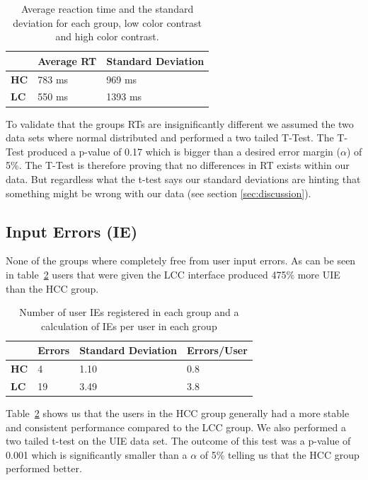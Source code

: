 \documentclass[runningheads,a4paper]{llncs}
\begin{document}
\begin{table}[]
	\centering
	\setlength{\tabcolsep}{1em}
	\setlength\extrarowheight{1em}
	\begin{tabular}{l|l|l}
		\textbf{} & \textbf{Average RT} & \textbf{Standard Deviation} \\ \hline
		\textbf{HC} & 783 ms & 969 ms \\ \hline
		\textbf{LC} & 550 ms & 1393 ms
	\end{tabular}
	\caption{Average reaction time and the standard deviation for each group, low color contrast and high color contrast.}
	\label{tab:groupRT}
\end{table}

To validate that the groups RTs are insignificantly different we assumed the two data sets where normal distributed and performed a two tailed T-Test. The T-Test produced a p-value of 0.17 which is bigger than a desired error margin ($\alpha$) of 5\%. The T-Test is therefore proving that no differences in RT exists within our data. But regardless what the t-test says our standard deviations are hinting that something might be wrong with our data (see section \ref{sec:discussion}).

\subsection{Input Errors (IE)}
None of the groups where completely free from user input errors. As can be seen in table~\ref{tab:userIE} users that were given the LCC interface produced 475\% more UIE than the HCC group.

\begin{table}[]
	\centering
	\setlength{\tabcolsep}{1em}
	\setlength\extrarowheight{1em}
	\begin{tabular}{l|l|l|l}
		\textbf{} & \textbf{Errors} & \textbf{Standard Deviation} & \textbf{Errors/User} \\ \hline
		\textbf{HC} & 4 & 1.10 & 0.8 \\ \hline
		\textbf{LC} & 19 & 3.49 & 3.8
	\end{tabular}
	\caption{Number of user IEs registered in each group and a calculation of IEs per user in each group}
	\label{tab:userIE}
\end{table}

Table~\ref{tab:userIE} shows us that the users in the HCC group generally had a more stable and consistent performance compared to the LCC group. We also performed a two tailed t-test on the UIE data set. The outcome of this test was a p-value of 0.001 which is significantly smaller than a $\alpha$ of 5\% telling us that the HCC group performed better.
\end{document}
